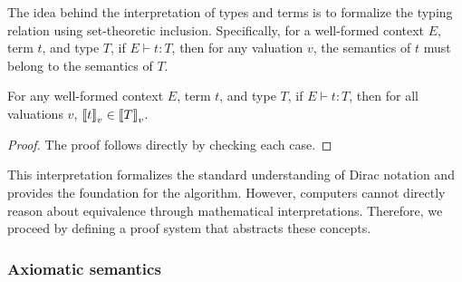 
The idea behind the interpretation of types and terms is to formalize the typing relation using set-theoretic inclusion. Specifically, for a well-formed context \( E \), term \( t \), and type \( T \), if \( E \vdash t : T \), then for any valuation \( v \), the semantics of \( t \) must belong to the semantics of \( T \).

\begin{lemma}
    For any well-formed context \( E \), term \( t \), and type \( T \), if \( E \vdash t : T \), then for all valuations \( v \), \( {\llbracket t \rrbracket}_v \in {\llbracket T \rrbracket}_v \).
\end{lemma}

\begin{proof}
    The proof follows directly by checking each case.
\end{proof}

This interpretation formalizes the standard understanding of Dirac notation and provides the foundation for the algorithm. However, computers cannot directly reason about equivalence through mathematical interpretations. Therefore, we proceed by defining a proof system that abstracts these concepts.



\subsubsection{Axiomatic semantics} 

